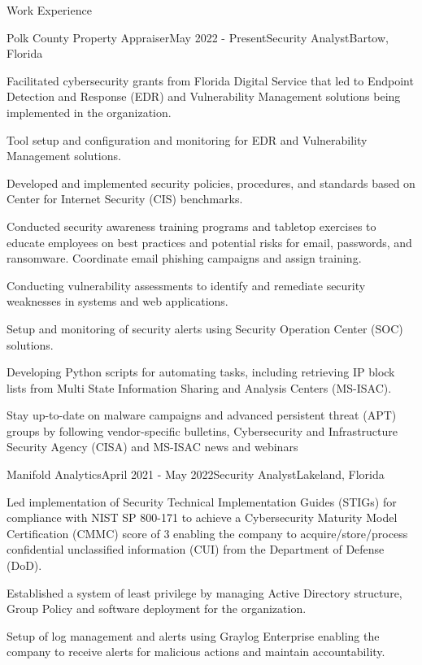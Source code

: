 \documentclass{resume} %
\begin{document}

\begin{rSection}{Work Experience}

	\begin{rSubsection}{Polk County Property Appraiser}{May 2022 - Present}{Security Analyst}{Bartow, Florida}
		\item Facilitated cybersecurity grants from Florida Digital Service that led to Endpoint Detection and Response (EDR) and Vulnerability Management solutions being implemented in the organization.
		\item Tool setup and configuration and monitoring for EDR and Vulnerability Management solutions.
		\item Developed and implemented security policies, procedures, and standards based on Center for Internet Security (CIS) benchmarks.
		\item Conducted security awareness training programs and tabletop exercises to educate employees on best practices and potential risks for email, passwords, and ransomware. Coordinate email phishing campaigns and assign training.
		\item Conducting vulnerability assessments to identify and remediate security weaknesses in systems and web applications. %
		\item Setup and monitoring of security alerts using Security Operation Center (SOC) solutions.
		\item Developing Python scripts for automating tasks, including retrieving IP block lists from Multi State Information Sharing and Analysis Centers (MS-ISAC).
		\item Stay up-to-date on malware campaigns and advanced persistent threat (APT) groups by following vendor-specific bulletins, Cybersecurity and Infrastructure Security Agency (CISA) and MS-ISAC news and webinars
	\end{rSubsection}
	\begin{rSubsection}{Manifold Analytics}{April 2021 - May 2022}{Security Analyst}{Lakeland, Florida}
		\item Led implementation of Security Technical Implementation Guides (STIGs) for compliance with NIST SP 800-171 to achieve a Cybersecurity Maturity Model Certification (CMMC) score of 3 enabling the company to acquire/store/process confidential unclassified information (CUI) from the Department of Defense (DoD).
		\item Established a system of least privilege by managing Active Directory structure, Group Policy and software deployment for the organization.
		\item Setup of log management and alerts using Graylog Enterprise enabling the company to receive alerts for malicious actions and maintain accountability.
	\end{rSubsection}


\end{rSection}
\end{document}
